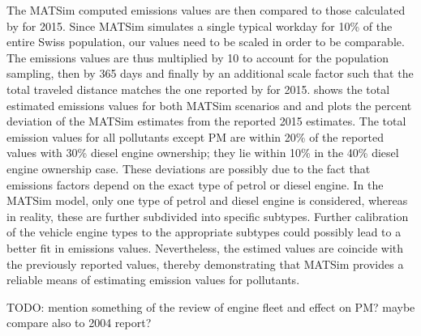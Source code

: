 The MATSim computed emissions values are then compared to those calculated by \cite{foen2010pollutants} for 2015.
Since MATSim simulates a single typical workday for 10\% of the entire Swiss population, our values need to be scaled in order to be comparable.
The emissions values are thus multiplied by 10 to account for the population sampling, then by 365 days and finally by an additional scale factor such that the total traveled distance matches the one reported by \cite{foen2010pollutants} for 2015.
 shows the total estimated emissions values for both MATSim scenarios and \cite{foen2010pollutants} and  plots the percent deviation of the MATSim estimates from the reported 2015 estimates.
The total emission values for all pollutants except PM are within 20\% of the reported values with 30\% diesel engine ownership; they lie within 10\% in the 40\% diesel engine ownership case.
These deviations are possibly due to the fact that emissions factors depend on the exact type of petrol or diesel engine.
In the MATSim model, only one type of petrol and diesel engine is considered, whereas in reality, these are further subdivided into specific subtypes.
Further calibration of the vehicle engine types to the appropriate subtypes could possibly lead to a better fit in emissions values.
Nevertheless, the estimed values are coincide with the previously reported values, thereby demonstrating that MATSim provides a reliable means of estimating emission values for pollutants.

TODO:
mention something of the review of engine fleet and effect on PM?
maybe compare also to 2004 report?

